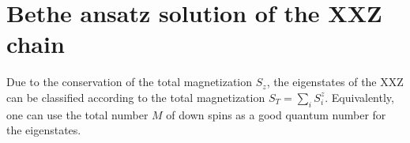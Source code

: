\documentclass[twocolumn,superscriptaddress,prb,10pt]{revtex4-1}
\begin{document}

\section{Bethe ansatz solution of the XXZ chain} 
\label{xxz-ba}

Due to the conservation of the total magnetization $S_z$, the eigenstates of the 
XXZ can be classified according to the total magnetization $S_T=\sum_i S_i^z$. 
Equivalently, one can use the total number $M$ of down spins as a good 
quantum number for the eigenstates. 
\end{document}
